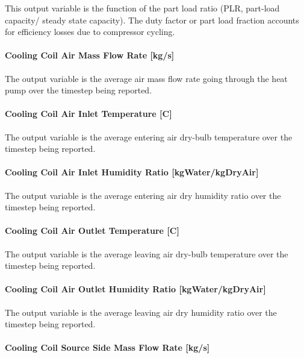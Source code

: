 This output variable is the function of the part load ratio (PLR, part-load capacity/ steady state capacity). The duty factor or part load fraction accounts for efficiency losses due to compressor cycling.

\paragraph{Cooling Coil Air Mass Flow Rate {[}kg/s{]}}\label{cooling-coil-air-mass-flow-rate-kgs-1}

The output variable is the average air mass flow rate going through the heat pump over the timestep being reported.

\paragraph{Cooling Coil Air Inlet Temperature {[}C{]}}\label{cooling-coil-air-inlet-temperature-c-1}

The output variable is the average entering air dry-bulb temperature over the timestep being reported.

\paragraph{Cooling Coil Air Inlet Humidity Ratio {[}kgWater/kgDryAir{]}}\label{cooling-coil-air-inlet-humidity-ratio-kgwaterkgdryair-1}

The output variable is the average entering air dry humidity ratio over the timestep being reported.

\paragraph{Cooling Coil Air Outlet Temperature {[}C{]}}\label{cooling-coil-air-outlet-temperature-c-1}

The output variable is the average leaving air dry-bulb temperature over the timestep being reported.

\paragraph{Cooling Coil Air Outlet Humidity Ratio {[}kgWater/kgDryAir{]}}\label{cooling-coil-air-outlet-humidity-ratio-kgwaterkgdryair-1}

The output variable is the average leaving air dry humidity ratio over the timestep being reported.

\paragraph{Cooling Coil Source Side Mass Flow Rate {[}kg/s{]}}\label{cooling-coil-source-side-mass-flow-rate-kgs}

